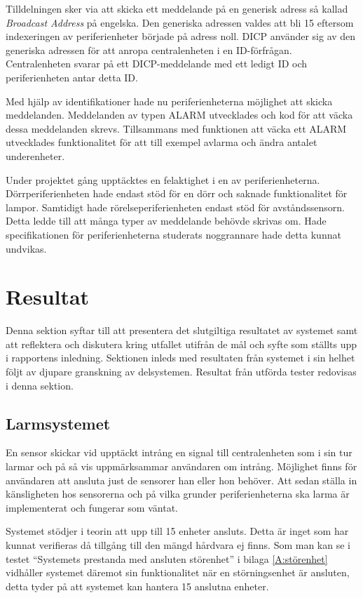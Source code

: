 \documentclass[a4paper]{article}
\begin{document}
Tilldelningen sker via att skicka ett meddelande på en generisk adress så kallad \textit{Broadcast Address} på engelska.
Den generiska adressen valdes att bli 15 eftersom indexeringen av periferienheter började på adress noll.
DICP använder sig av den generiska adressen för att anropa centralenheten i en ID-förfrågan.
Centralenheten svarar på ett DICP-meddelande med ett ledigt ID och periferienheten antar detta ID.

Med hjälp av identifikationer hade nu periferienheterna möjlighet att skicka meddelanden.
Meddelanden av typen ALARM utvecklades och kod för att väcka dessa meddelanden skrevs.
Tillsammans med funktionen att väcka ett ALARM utvecklades funktionalitet för att till exempel avlarma och ändra antalet underenheter.

Under projektet gång upptäcktes en felaktighet i en av periferienheterna.
Dörrperiferienheten hade endast stöd för en dörr och saknade funktionalitet för lampor.
Samtidigt hade rörelseperiferienheten endast stöd för avståndssensorn.
Detta ledde till att många typer av meddelande behövde skrivas om.
Hade specifikationen för periferienheterna studerats noggrannare hade detta kunnat undvikas.

\newpage
\section{Resultat}
Denna sektion syftar till att presentera det slutgiltiga resultatet av systemet samt att reflektera och diskutera kring utfallet utifrån de mål och syfte som ställts upp i rapportens inledning.
Sektionen inleds med resultaten från systemet i sin helhet följt av djupare granskning av delsystemen.
Resultat från utförda tester redovisas i denna sektion.

\subsection{Larmsystemet}
En sensor skickar vid upptäckt intrång en signal till centralenheten som i sin tur larmar och på så vis uppmärksammar användaren om intrång.
Möjlighet finns för användaren att ansluta just de sensorer han eller hon behöver.
Att sedan ställa in känsligheten hos sensorerna och på vilka grunder periferienheterna ska larma är implementerat och fungerar som väntat.

Systemet stödjer i teorin att upp till 15 enheter ansluts. Detta är inget som har kunnat verifieras då tillgång till den mängd hårdvara ej finns.
Som man kan se i testet ``Systemets prestanda med ansluten störenhet'' i bilaga \ref{A:störenhet} vidhåller systemet däremot sin funktionalitet när en störningsenhet är ansluten, detta tyder på att systemet kan hantera 15 anslutna enheter.
\end{document}
